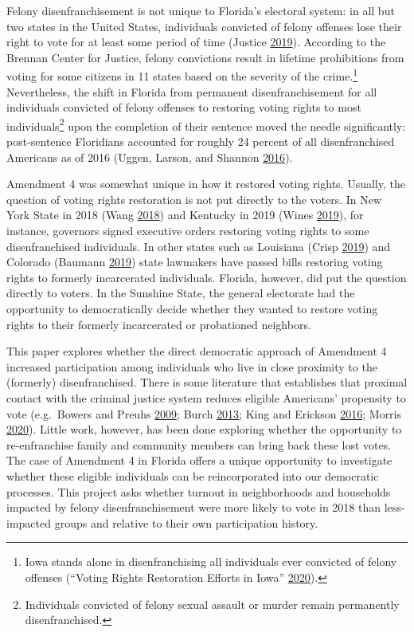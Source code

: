 \documentclass[
  12pt,
]{article}
\begin{document}
Felony disenfranchisement is not unique to Florida's electoral system: in all but two states in the United States, individuals convicted of felony offenses lose their right to vote for at least some period of time (Justice \protect\hyperlink{ref-bcj_laws}{2019}). According to the Brennan Center for Justice, felony convictions result in lifetime prohibitions from voting for some citizens in 11 states based on the severity of the crime.\footnote{Iowa stands alone in disenfranchising all individuals ever convicted of felony offenses (``Voting Rights Restoration Efforts in Iowa'' \protect\hyperlink{ref-bcj_iowa}{2020}).} Nevertheless, the shift in Florida from permanent disenfranchisement for all individuals convicted of felony offenses to restoring voting rights to most individuals\footnote{Individuals convicted of felony sexual assault or murder remain permanently disenfranchised.} upon the completion of their sentence moved the needle significantly: post-sentence Floridians accounted for roughly 24 percent of all disenfranchised Americans as of 2016 (Uggen, Larson, and Shannon \protect\hyperlink{ref-sentencing_2016}{2016}).

Amendment 4 was somewhat unique in how it restored voting rights. Usually, the question of voting rights restoration is not put directly to the voters. In New York State in 2018 (Wang \protect\hyperlink{ref-Wang2018}{2018}) and Kentucky in 2019 (Wines \protect\hyperlink{ref-Wines2019}{2019}), for instance, governors signed executive orders restoring voting rights to some disenfranchised individuals. In other states such as Louisiana (Crisp \protect\hyperlink{ref-Crisp2019}{2019}) and Colorado (Baumann \protect\hyperlink{ref-Baumann2019}{2019}) state lawmakers have passed bills restoring voting rights to formerly incarcerated individuals. Florida, however, did put the question directly to voters. In the Sunshine State, the general electorate had the opportunity to democratically decide whether they wanted to restore voting rights to their formerly incarcerated or probationed neighbors.

This paper explores whether the direct democratic approach of Amendment 4 increased participation among individuals who live in close proximity to the (formerly) disenfranchised. There is some literature that establishes that proximal contact with the criminal justice system reduces eligible Americans' propensity to vote (e.g.~Bowers and Preuhs \protect\hyperlink{ref-Bowers2009}{2009}; Burch \protect\hyperlink{ref-Burch2013}{2013}; King and Erickson \protect\hyperlink{ref-King2016}{2016}; Morris \protect\hyperlink{ref-Morris2020}{2020}). Little work, however, has been done exploring whether the opportunity to re-enfranchise family and community members can bring back these lost votes. The case of Amendment 4 in Florida offers a unique opportunity to investigate whether these eligible individuals can be reincorporated into our democratic processes. This project asks whether turnout in neighborhoods and households impacted by felony disenfranchisement were more likely to vote in 2018 than less-impacted groups and relative to their own participation history.
\end{document}
